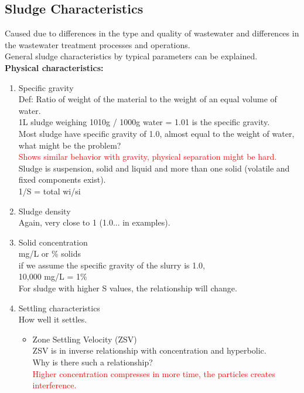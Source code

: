 \documentclass[12pt]{article}
\begin{document}
\subsection{Sludge Characteristics}
Caused due to differences in the type and quality of wastewater and differences in the wastewater treatment processes and operations.\\
General sludge characteristics by typical parameters can be explained.\\
\textbf{Physical characteristics:}
\begin{enumerate}
    \item Specific gravity\\
    Def: Ratio of  weight of the material to the weight of an equal volume of water.\\
    1L sludge weighing 1010g / 1000g water = 1.01 is the specific gravity.\\
    Most sludge have specific gravity of 1.0, almost equal to the weight of water, what might be the problem?\\
    \textcolor{red}{Shows similar behavior with gravity, physical separation might be hard.}\\ %
    Sludge is suspension, solid and liquid and more than one solid (volatile and fixed components exist).\\
    1/S = total wi/si %
    \item Sludge density\\
    Again, very close to 1 (1.0... in examples).
    \item Solid concentration\\ %
    mg/L or \% solids\\
    if we assume the specific gravity of the slurry is 1.0,\\
    10,000 mg/L = 1\%\\
    For sludge with higher S values, the relationship will change.
    \item Settling characteristics\\
    How well it settles.
    \begin{itemize}
        \item Zone Settling Velocity (ZSV)\\
        ZSV is in inverse relationship with concentration and hyperbolic.\\ %
        Why is there such a relationship?\\
        \textcolor{red}{Higher concentration compresses in more time, the particles creates interference.}\\ %

\end{itemize}
\end{enumerate}
\end{document}
